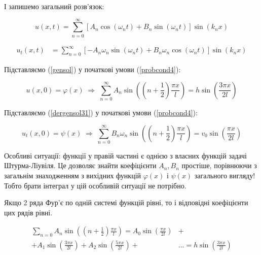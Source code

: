 \documentclass[a4paper, 14pt]{extreport}
\begin{document}
І запишемо загальний розв'язок:

\begin{equation} \label{gensol}
    u(x,t) = \sum^{\infty}_{n=0} \left[A_n\cos(\omega_n t) + B_n\sin(\omega_n t)\right] \sin(k_n x)
\end{equation}

\begin{equation} \label{dersol}
    \begin{aligned}
        u_t(x,t) &= 
   \sum^{\infty}_{n=0}\left[-A_n\omega_n\sin(\omega_n t) + B_n\omega_n\cos(\omega_n t)\right] \sin(k_n x)  
    \end{aligned}
\end{equation}

Підставляємо (\ref{gensol}) у початкові умови (\ref{probcond4}):

\begin{equation} \label{sol-init-pos}
    u(x,0) = \varphi(x) \;\Rightarrow\; \sum^{\infty}_{n=0} A_n\sin\left((n + \frac{1}{2}) \frac{\pi x}{l} \right) = h \sin \left( \frac{3 \pi x}{2l} \right)
\end{equation}


Підставляємо (\ref{dergensol31}) у початкові умови (\ref{probcond4}):

\begin{equation} \label{sol-init-pos}
    u_t(x,0) = \psi(x) \;\Rightarrow\; \sum^{\infty}_{n=0} B_n \omega_n \sin\left((n + \frac{1}{2}) \frac{\pi x}{l} \right) = v_0 \sin \left( \frac{ \pi x}{2l} \right)
\end{equation}

Особливі ситуації: функції у правій частині є однією з власних функцій задачі Штурма-Ліувіля. Це дозволяє знайти коефіцієнти $A_n, B_n$ простіше, порівнюючи з загальнім знаходженням з вихідних функцій $\varphi(x)$ і  $\psi(x)$ загального вигляду! Тобто брати інтеграл у цій особливій ситуації не потрібно.


Якщо 2 ряда Фур'є по одній системі функцій рівні, то і відповідні коефіцієнти цих рядів рівні.

\begin{equation}
    \begin{aligned}
        \sum_{n=0} A_n \sin \left( (n + \frac{1}{2}) \frac{\pi x}{l} \right) = A_0 \sin \left(\frac{\pi x}{2 l} \right) &+\\
        + A_1 \sin \left(\frac{3 \pi x}{2 l} \right) + A_2 \sin \left(\frac{5 \pi x}{2 l} \right) + &... = h \sin \left( \frac{3 \pi x}{2 l} \right)
    \end{aligned}
\end{equation}
\end{document}
